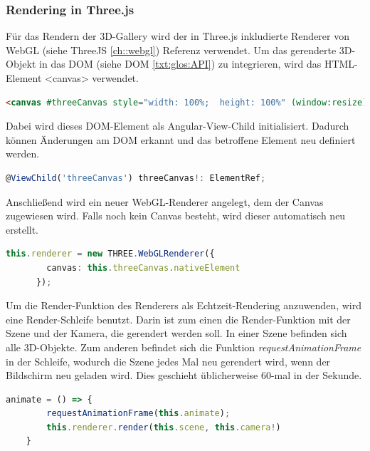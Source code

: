 \subsubsection{Rendering in Three.js}
Für das Rendern der 3D-Gallery wird der in Three.js inkludierte Renderer von WebGL (siehe ThreeJS \ref{ch::webgl}) Referenz verwendet. Um das gerenderte 3D-Objekt in das DOM (siehe DOM \ref{txt:glos:API}) zu integrieren, wird das HTML-Element <canvas> verwendet. \cite{ThreejsWebGLRenderer}

\begin{lstlisting}[caption={Canvas-Element in HTML},language=HTML,label=lst:impl:canvas]
    <canvas #threeCanvas style="width: 100%;  height: 100%" (window:resize)="onResize($event)"></canvas>
\end{lstlisting}
Dabei wird dieses DOM-Element als Angular-View-Child initialisiert. Dadurch können Änderungen am DOM erkannt und das betroffene Element neu definiert werden. \cite{AngularViewChild}
\begin{lstlisting}[caption={Canvas als View-Child initialisieren},language=TypeScript,label=lst:impl:viewchild]
    @ViewChild('threeCanvas') threeCanvas!: ElementRef;
\end{lstlisting}
Anschließend wird ein neuer WebGL-Renderer angelegt, dem der Canvas zugewiesen wird. Falls noch kein Canvas besteht, wird dieser automatisch neu erstellt. \cite{ThreejsWebGLRenderer}
\begin{lstlisting}[caption={WebGlRenderer anlegen},language=TypeScript,label=lst:impl:WebGlRenderer]
    this.renderer = new THREE.WebGLRenderer({
        canvas: this.threeCanvas.nativeElement
      });
\end{lstlisting}
Um die Render-Funktion des Renderers als Echtzeit-Rendering anzuwenden, wird eine Render-Schleife benutzt. Darin ist zum einen die Render-Funktion mit der Szene und der Kamera, die gerendert werden soll. In einer Szene befinden sich alle 3D-Objekte. Zum anderen befindet sich die Funktion \emph{requestAnimationFrame} in der Schleife, wodurch die Szene jedes Mal neu gerendert wird, wenn der Bildschirm neu geladen wird. Dies geschieht üblicherweise 60-mal in der Sekunde. \cite{ThreejsCreateAScene}
\begin{lstlisting}[caption={Animations-Schleife},language=TypeScript,label=lst:impl:animationloop]
    animate = () => {
        requestAnimationFrame(this.animate);
        this.renderer.render(this.scene, this.camera!)
    }  
\end{lstlisting}

